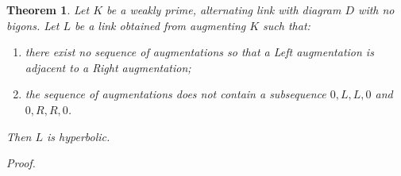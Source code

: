 \documentclass[11pt]{amsart}
\theoremstyle{plain}
\newtheorem{theorem}{Theorem}[section]
\theoremstyle{definition}
\begin{document}
\begin{theorem}
Let $K$ be a weakly prime, alternating link with diagram $D$ with no bigons. Let $L$ be a link obtained from augmenting $K$ such that:
\begin{enumerate}
\item there exist no sequence of augmentations so that a Left augmentation is adjacent to a Right augmentation;
\item the sequence of augmentations does not contain a subsequence $0, L, L, 0$ and $0, R, R, 0$.
\end{enumerate}  
Then $L$ is hyperbolic.
\end{theorem}

{\it Proof.}



\end{document}
